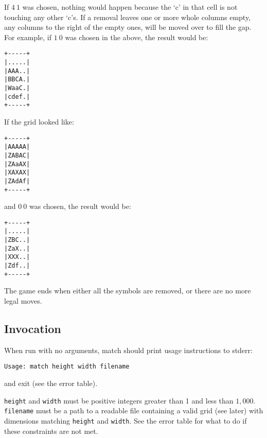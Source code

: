 If $4\:1$ was chosen, nothing would happen because the `c' in that cell is not touching any other `c's.
If a removal leaves one or more whole columns empty, any columns to the right of the empty ones, will be
moved over to fill the gap.
For example, if $1\:0$ was chosen in the above, the result would be:

\begin{center}
\begin{verbatim}
+-----+
|.....|
|AAA..|
|BBCA.|
|WaaC.|
|cdef.|
+-----+
\end{verbatim}
\end{center}

If the grid looked like:
\begin{center}
\begin{verbatim}
+-----+
|AAAAA|
|ZABAC|
|ZAaAX|
|XAXAX|
|ZAdAf|
+-----+
\end{verbatim}
\end{center}
and $0\:0$ was chosen, the result would be:
\begin{center}
\begin{verbatim}
+-----+
|.....|
|ZBC..|
|ZaX..|
|XXX..|
|Zdf..|
+-----+
\end{verbatim}
\end{center}

The game ends when either all the symbols are removed, or there are no more legal moves.


\subsection{Invocation}\label{sec:invoc}
\noindent
When run with no arguments, match should print usage instructions to stderr:\\
\begin{verbatim}
Usage: match height width filename
\end{verbatim}
and exit (see the error table).

\texttt{height} and \texttt{width} must be positive integers greater than 1 and less than $1,000$.
\texttt{filename} must be a path to a readable file containing a valid grid (see later) with dimensions matching \texttt{height}
and \texttt{width}.
See the error table for what to do if these constraints are not met.


